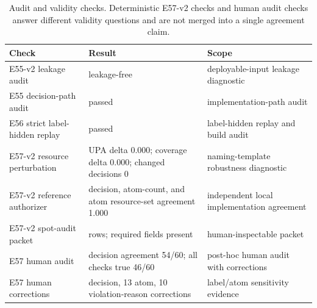 \begin{table}[t]
\centering
\scriptsize
\caption{Audit and validity checks. Deterministic E57-v2 checks and human audit checks answer different validity questions and are not merged into a single agreement claim.}
\label{tab:audit}
\begin{tabularx}{\textwidth}{>{\raggedright\arraybackslash}p{} >{\raggedright\arraybackslash}X >{\raggedright\arraybackslash}p{}}
\toprule
Check & Result & Scope \\
\midrule
E55-v2 leakage audit & leakage-free & deployable-input leakage diagnostic \\
E55 decision-path audit & passed & implementation-path audit \\
E56 strict label-hidden replay & passed & label-hidden replay and build audit \\
E57-v2 resource perturbation & UPA delta 0.000; coverage delta 0.000; changed decisions 0 & naming-template robustness diagnostic \\
E57-v2 reference authorizer & decision, atom-count, and atom resource-set agreement 1.000 & independent local implementation agreement \\
E57-v2 spot-audit packet & 60 rows; required fields present & human-inspectable packet \\
E57 human audit & decision agreement 54/60; all checks true 46/60 & post-hoc human audit with corrections \\
E57 human corrections & 6 decision, 13 atom, 10 violation-reason corrections & label/atom sensitivity evidence \\
\bottomrule
\end{tabularx}
\end{table}
